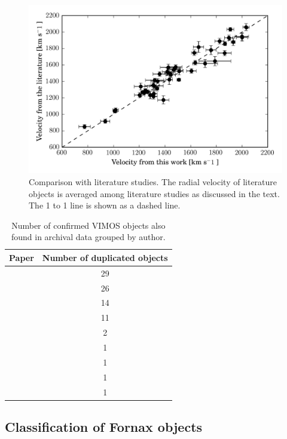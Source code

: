 \documentclass[useAMS,usenatbib]{mn2e}
\begin{document}
\begin{figure}
\centering
\includegraphics[width=\columnwidth]{figures/vel_literature.png} 
\caption{Comparison with literature studies. The radial velocity of literature 
objects is averaged among literature studies as discussed in the text. The 1 to 
1 line is shown as a dashed line. }
\label{fig:vel_comparison}
\end{figure}
 
\begin{table}
\centering
\label{mathmode}
\begin{tabular}{@{}l c}
\hline
Paper & Number of duplicated objects \\
\hline
\citet{Dirsch04}       &  29 \\
\citet{Schuberth}      &  26 \\
\citet{Bergond07}      &  14 \\
\citet{Firth07}        &  11 \\
\citet{Chilingarian11} &  2  \\
\citet{Mieske04}       &  1  \\
\citet{Hilker07}       &  1  \\
\citet{Francis12}      &  1  \\
\citet{Drinkwater00}   &  1  \\
\hline
\end{tabular}
\caption{Number of confirmed VIMOS objects also found in archival data grouped 
by author.}
\label{tab:authors} 
\end{table}

\subsection{Classification of Fornax objects}
\end{document}
